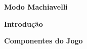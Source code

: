 \documentclass[12pt]{article}
\begin{document}
 

\begin{titlepage}
    \begin{center}
        \Huge\textbf{Modo Machiavelli}
         
        \vspace{10cm}
    \end{center}
\end{titlepage}

\begin{center}
    \Huge\textbf{Introdu\c c\~ao}
\end{center}



\pagebreak


\begin{center}
    \Huge\textbf{Componentes do Jogo}
\end{center}
\end{document}

